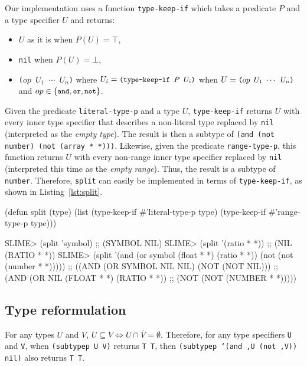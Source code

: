 \documentclass[format=sigconf]{acmart}
\newcommand\code[2][\small]{\sloppy\texttt{#1#2}}
\newcommand\mcode[2][\small]{\text{\code[#1]{#2}}}
\theoremstyle{definition}
\begin{document}
Our implementation uses a function \code{type-keep-if} which takes a predicate
$P$ and a type specifier $U$ and returns:
\begin{itemize}
\item $U$ as it is when $P(U) = \top$,
\item \code{nil} when $P(U) = \bot$,
\item \code{($op$ $U_1$ $\cdots$ $U_n$)}
  where \(U_i = \mcode{(type-keep-if $P$ $U_i$)}\)
  when \(U = \mcode{($op$ $U_1$ $\cdots$ $U_n$)}\)
  and $op \in \{\mcode{and}, \mcode{or}, \mcode{not}\}$.
\end{itemize}
Given the predicate \code{literal-type-p} and a type $U$, \code{type-keep-if}
returns $U$ with every inner type specifier that describes a non-literal type
replaced by \code{nil} (interpreted as the \textit{empty type}). The result is then a
subtype of \code{(and (not number) (not (array * *)))}.
Likewise, given the predicate \code{range-type-p}, this function returns $U$
with every non-range inner type specifier replaced by \code{nil} (interpreted
this time as the \textit{empty range}). Thus, the result is a subtype of \code{number}.
Therefore, \code{split} can easily be implemented in terms of
\code{type-keep-if}, as shown in Listing~\ref{lst:split}.

\begin{listing}
\begin{clcode}
(defun split (type)
  (list (type-keep-if #'literal-type-p type)
        (type-keep-if #'range-type-p type)))
\end{clcode}
\medskip
\begin{clcode}
SLIME> (split 'symbol)
;; (SYMBOL NIL)
SLIME> (split '(ratio * *))
;; (NIL (RATIO * *))
SLIME> (split  '(and (or symbol (float * *) (ratio * *))
                     (not (not (number * *)))))
;; ((AND (OR SYMBOL NIL NIL) (NOT (NOT NIL)))
;;  (AND (OR NIL (FLOAT * *) (RATIO * *))
;;       (NOT (NOT (NUMBER * *)))))
\end{clcode}
\caption{The \code{split} function}
\label{lst:split}
\end{listing}

\subsection{Type reformulation}
For any types $U$ and $V$,
\(U \subseteq V \Leftrightarrow U \cap \overline{V} = \emptyset\).
Therefore, for any type specifiers \code{U} and \code{V}, when
\code{(subtypep U V)} returns \code{T T}, then
\code{(subtypep `(and ,U (not ,V)) nil)} also returns \code{T T}.
\end{document}
